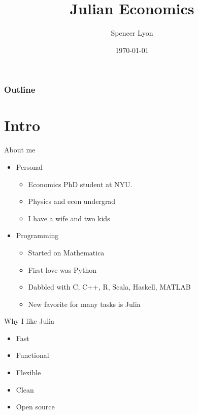 \documentclass[compress,10pt]{beamer}
\title{Julian Economics}
\author{Spencer Lyon}
\date{\today}
\begin{document}
\begin{frame}[fragile]
  \titlepage
\end{frame}

\begin{frame} \frametitle{Outline}
\tableofcontents[hideallsubsections]
\end{frame}

\section{Intro}\label{intro}

\begin{frame}{About me}

\begin{itemize}
\itemsep1pt\parskip0pt
\item
  Personal

  \begin{itemize}
  \itemsep1pt\parskip0pt
  \item
    Economics PhD student at NYU.
  \item
    Physics and econ undergrad
  \item
    I have a wife and two kids
  \end{itemize}
\item
  Programming

  \begin{itemize}
  \itemsep1pt\parskip0pt
  \item
    Started on Mathematica
  \item
    First love was Python
  \item
    Dabbled with C, C++, R, Scala, Haskell, MATLAB
  \item
    New favorite for many tasks is Julia
  \end{itemize}
\end{itemize}

\end{frame}

\begin{frame}{Why I like Julia}

\begin{itemize}
\itemsep1pt\parskip0pt
\item
  Fast
\item
  Functional
\item
  Flexible
\item
  Clean
\item
  Open source
\end{itemize}

\end{frame}
\end{document}
